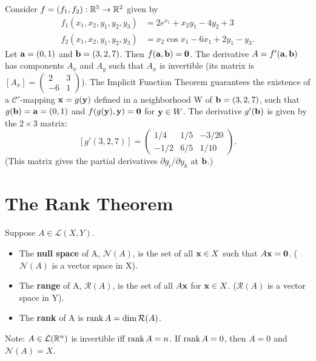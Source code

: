 \begin{example}
  \label{ex:chap9:ift_application}
  Consider $f=(f_1, f_2): \mathbb{R}^5 \to \mathbb{R}^2$ given by
  \begin{align*}
    f_1(x_1, x_2, y_1, y_2, y_3) &= 2e^{x_1} + x_2 y_1 - 4y_2 + 3 \\
    f_2(x_1, x_2, y_1, y_2, y_3) &= x_2 \cos x_1 - 6x_1 + 2y_1 - y_3.
  \end{align*}
  Let $\mathbf{a}=(0, 1)$ and $\mathbf{b}=(3, 2, 7)$. Then $f(\mathbf{a},
  \mathbf{b}) = \mathbf{0}$.
  The derivative $A = f'(\mathbf{a}, \mathbf{b})$ has components $A_x$
  and $A_y$ such that $A_x$ is invertible (its matrix is $[A_x] =
    \begin{pmatrix} 2 & 3 \\ -6 & 1
  \end{pmatrix}$).
  The Implicit Function Theorem guarantees the existence of a
  $\mathcal{C}'$-mapping $\mathbf{x} = g(\mathbf{y})$ defined in a
  neighborhood W of $\mathbf{b}=(3, 2, 7)$, such that $g(\mathbf{b}) =
  \mathbf{a}=(0, 1)$ and $f(g(\mathbf{y}), \mathbf{y}) = \mathbf{0}$ for
  $\mathbf{y} \in W$.
  The derivative $g'(\mathbf{b})$ is given by the $2 \times 3$ matrix:
  \[
    [g'(3, 2, 7)] =
    \begin{pmatrix}
      1/4 & 1/5 & -3/20 \\
      -1/2 & 6/5 & 1/10
    \end{pmatrix}.
  \]
  (This matrix gives the partial derivatives $\partial g_i / \partial
  y_k$ at $\mathbf{b}$.)
\end{example}



\section{The Rank Theorem}


\begin{definition}
  \label{def:chap9:null_space_range_rank}
  Suppose $A \in \mathcal{L}(X, Y)$.
  \begin{itemize}
    \item The \textbf{null space} of A, $\mathcal{N}(A)$, is the set
      of all $\mathbf{x} \in X$ such that $A\mathbf{x} = \mathbf{0}$.
      ($\mathcal{N}(A)$ is a vector space in X).
    \item The \textbf{range} of A, $\mathcal{R}(A)$, is the set of
      all $A\mathbf{x}$ for $\mathbf{x} \in X$. ($\mathcal{R}(A)$ is a
      vector space in Y).
    \item The \textbf{rank} of A is $\operatorname{rank} A = \dim \mathcal{R}(A)$.
  \end{itemize}
  Note: $A \in \mathcal{L}(\mathbb{R}^n)$ is invertible iff $\operatorname{rank} A = n$. If
  $\operatorname{rank} A = 0$, then $A=0$ and $\mathcal{N}(A)=X$.
\end{definition}

